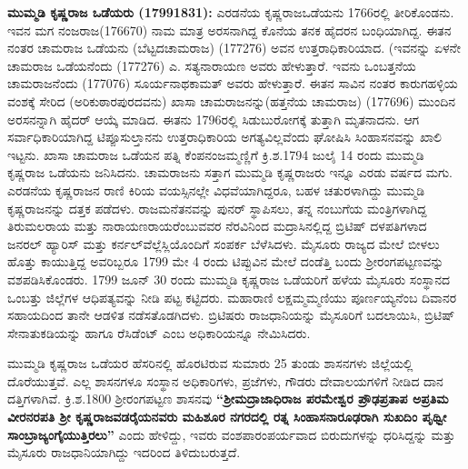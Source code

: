 \textbf{ಮುಮ್ಮಡಿ ಕೃಷ್ಣರಾಜ ಒಡೆಯರು (17991831): } ಎರಡನೆಯ ಕೃಷ್ಣರಾಜಒಡೆಯನು 1766ರಲ್ಲಿ ತೀರಿಕೊಂಡನು. ಇವನ ಮಗ ನಂಜರಾಜ(176670) ನಾಮ ಮಾತ್ರ ಅರಸನಾಗಿದ್ದ ಕೊನೆಯ ತನಕ ಹೈದರನ ಬಂಧಿಯಾಗಿದ್ದ. ಈತನ ನಂತರ ಚಾಮರಾಜ ಒಡೆಯನು (ಬೆಟ್ಟದಚಾಮರಾಜ) (177276) ಅವನ ಉತ್ತರಾಧಿಕಾರಿಯಾದ. (ಇವನನ್ನು ಏಳನೇ ಚಾಮರಾಜ ಒಡೆಯನೆಂದು (177276) ಎ. ಸತ್ಯನಾರಾಯಣ ಅವರು ಹೇಳುತ್ತಾರೆ. ಇವನು ಒಂಬತ್ತನೆಯ ಚಾಮರಾಜನೆಂದು (177076) ಸೂರ್ಯನಾಥಕಾಮತ್​ ಅವರು ಹೇಳುತ್ತಾರೆ. ಈತನ ಸಾವಿನ ನಂತರ ಕಾರುಗಹಳ್ಳಿಯ ವಂಶಕ್ಕೆ ಸೇರಿದ (ಅರಿಕುಠಾರಪುರದವನು) ಖಾಸಾ ಚಾಮರಾಜನನ್ನು(ಹತ್ತನೆಯ ಚಾಮರಾಜ) (177696) ಮುಂದಿನ ಅರಸನನ್ನಾಗಿ ಹೈದರ್​ ಆಯ್ಕೆ ಮಾಡಿದ. ಈತನು 1796ರಲ್ಲಿ ಸಿಡುಬುರೋಗಕ್ಕೆ ತುತ್ತಾಗಿ ಮೃತನಾದನು. ಆಗ ಸರ್ವಾಧಿಕಾರಿಯಾಗಿದ್ದ ಟಿಪ್ಪೂಸುಲ್ತಾನನು ಉತ್ತರಾಧಿಕಾರಿಯ ಅಗತ್ಯವಿಲ್ಲವೆಂದು ಘೋಷಿಸಿ ಸಿಂಹಾಸನವನ್ನು ಖಾಲಿ ಇಟ್ಟನು. ಖಾಸಾ ಚಾಮರಾಜ ಒಡೆಯನ ಪತ್ನಿ ಕೆಂಪನಂಜಮ್ಮಣ್ಣಿಗೆ ಕ್ರಿ.ಶ.1794 ಜುಲೈ 14 ರಂದು ಮುಮ್ಮಡಿ ಕೃಷ್ಣರಾಜ ಒಡೆಯನು ಜನಿಸಿದನು. ಚಾಮರಾಜನು ಸತ್ತಾಗ ಮುಮ್ಮಡಿ ಕೃಷ್ಣರಾಜರು ಇನ್ನೂ ಎರಡು ವರ್ಷದ ಮಗು. ಎರಡನೆಯ ಕೃಷ್ಣರಾಜನ ರಾಣಿ ಕಿರಿಯ ವಯಸ್ಸಿನಲ್ಲೇ ವಿಧವೆಯಾಗಿದ್ದರೂ, ಬಹಳ ಚತುರಳಾಗಿದ್ದು ಮುಮ್ಮಡಿ ಕೃಷ್ಣರಾಜನನ್ನು ದತ್ತಕ ಪಡೆದಳು. ರಾಜಮನೆತನವನ್ನು ಪುನರ್​ ಸ್ಥಾಪಿಸಲು, ತನ್ನ ನಂಬುಗೆಯ ಮಂತ್ರಿಗಳಾಗಿದ್ದ ತಿರುಮಲರಾಯ ಮತ್ತು ನಾರಾಯಣರಾಯರೆಂಬುವವರ ನೆರವಿನಿಂದ ಮದ್ರಾಸಿನಲ್ಲಿದ್ದ ಬ್ರಿಟಿಷ್​ ದಳಪತಿಗಳಾದ ಜನರಲ್​ ಹ್ಯಾರಿಸ್​ ಮತ್ತು ಕರ್ನಲ್​ ವೆಲ್ಲೆಸ್ಲಿಯೊಂದಿಗೆ ಸಂಪರ್ಕ ಬೆಳೆಸಿದಳು. ಮೈಸೂರು ರಾಜ್ಯದ ಮೇಲೆ ಬೀಳಲು ಹೊತ್ತು ಕಾಯುತ್ತಿದ್ದ ಅವರಿಬ್ಬರೂ 1799 ಮೇ 4 ರಂದು ಟಿಪ್ಪುವಿನ ಮೇಲೆ ದಂಡೆತ್ತಿ ಬಂದು ಶ‍್ರೀರಂಗಪಟ್ಟಣವನ್ನು ವಶಪಡಿಸಿಕೊಂಡರು. 1799 ಜೂನ್​ 30 ರಂದು ಮುಮ್ಮಡಿ ಕೃಷ್ಣರಾಜ ಒಡೆಯರಿಗೆ ಹಳೆಯ ಮೈಸೂರು ಸಂಸ್ಥಾನದ ಒಂಬತ್ತು ಜಿಲ್ಲೆಗಳ ಆಧಿಪತ್ಯವನ್ನು ನೀಡಿ ಪಟ್ಟ ಕಟ್ಟಿದರು. ಮಹಾರಾಣಿ ಲಕ್ಷಮ್ಮಮ್ಮಣಿಯು ಪೂರ್ಣಯ್ಯನೆಂಬ ದಿವಾನರ ಸಹಾಯದಿಂದ ತಾನೇ ಆಡಳಿತ ನಡೆಸತೊಡಗಿದಳು. ಬ್ರಿಟಿಷರು ರಾಜಧಾನಿಯನ್ನು ಮೈಸೂರಿಗೆ ಬದಲಾಯಿಸಿ, ಬ್ರಿಟಿಷ್​ ಸೇನಾತುಕಡಿಯನ್ನು ಹಾಗೂ ರೆಸಿಡೆಂಟ್​ ಎಂಬ ಅಧಿಕಾರಿಯನ್ನೂ ನೇಮಿಸಿದರು.

ಮುಮ್ಮಡಿ ಕೃಷ್ಣರಾಜ ಒಡೆಯರ ಹೆಸರಿನಲ್ಲಿ ಹೊರಟಿರುವ ಸುಮಾರು 25 ತುಂಡು ಶಾಸನಗಳು ಜಿಲ್ಲೆಯಲ್ಲಿ ದೊರೆಯುತ್ತವೆ. ಎಲ್ಲ ಶಾಸನಗಳೂ ಸಂಸ್ಥಾನ ಅಧಿಕಾರಿಗಳು, ಪ್ರಜೆಗಳು, ಗೌಡರು ದೇವಾಲಯಗಳಿಗೆ ನೀಡಿದ ದಾನ ದತ್ತಿಗಳಾಗಿವೆ. ಕ್ರಿ.ಶ.1800 ಶ‍್ರೀರಂಗಪಟ್ಟಣ ಶಾಸನವು\textbf{ “ಶ‍್ರೀಮದ್ರಾಜಾಧಿರಾಜ ಪರಮೇಶ್ವರ ಪ್ರೌಢಪ್ರತಾಪ ಅಪ್ರತಿಮ ವೀರನರಪತಿ ಶ‍್ರೀ ಕೃಷ್ಣರಾಜವಡರೈಯ\-ನವರು ಮಹಿಶೂರ ನಗರದಲ್ಲಿ ರತ್ನ ಸಿಂಹಾಸನಾರೂಢರಾಗಿ ಸುಖದಿಂ ಪೃಥ್ವೀ ಸಾಂಬ್ರಾಜ್ಯಂಗೈಯುತ್ತಿರಲು” }ಎಂದು ಹೇಳಿದ್ದು, ಇವರು ವಂಶಪಾರಂಪರ್ಯವಾದ ಬಿರುದುಗಳನ್ನು ಧರಿಸಿದ್ದನ್ನು ಮತ್ತು ಮೈಸೂರು ರಾಜಧಾನಿಯಾಗಿದ್ದು ಇದರಿಂದ ತಿಳಿದು\-ಬರುತ್ತದೆ.

